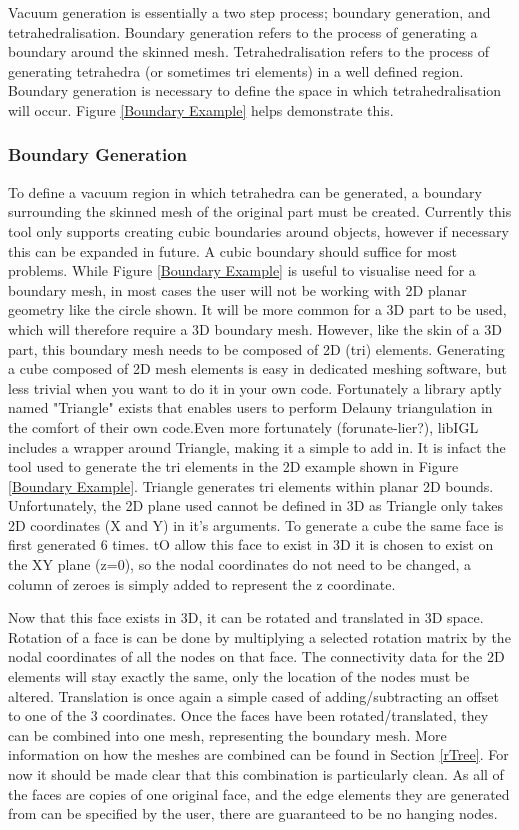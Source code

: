 \documentclass[12pt, letterpaper]{article}
\begin{document}
Vacuum generation is essentially a two step process; boundary generation, and tetrahedralisation. Boundary generation refers to the process of generating a boundary around the skinned mesh. Tetrahedralisation refers to the process of generating tetrahedra (or sometimes tri elements) in a well defined region. Boundary generation is necessary to define the space in which tetrahedralisation will occur. Figure \ref{Boundary Example} helps demonstrate this.

\subsubsection{Boundary Generation} \label{BoundaryGeneration}
To define a vacuum region in which tetrahedra can be generated, a boundary surrounding the skinned mesh of the original part must be created. Currently this tool only supports creating cubic boundaries around objects, however if necessary this can be expanded in future. A cubic boundary should suffice for most problems. While Figure \ref{Boundary Example} is useful to visualise need for a boundary mesh, in most cases the user will not be working with 2D planar geometry like the circle shown. It will be more common for a 3D part to be used, which will therefore require a 3D boundary mesh. However, like the skin of a 3D part, this boundary mesh needs to be composed of 2D (tri) elements. Generating a cube composed of 2D mesh elements is easy in dedicated meshing software, but less trivial when you want to do it in your own code. Fortunately a library aptly named "Triangle" exists that enables users to perform Delauny triangulation in the comfort of their own code.Even more fortunately (forunate-lier?), libIGL includes a wrapper around Triangle, making it a simple to add in. It is infact the tool used to generate the tri elements in the 2D example shown in Figure \ref{Boundary Example}. Triangle generates tri elements within planar 2D bounds. Unfortunately, the 2D plane used cannot be defined in 3D as Triangle only takes 2D coordinates (X and Y) in it's arguments. To generate a cube the same face is first generated 6 times. tO allow this face to exist in 3D it is chosen to exist on the XY plane (z=0), so the nodal coordinates do not need to be changed, a column of zeroes is simply added to represent the z coordinate. 

Now that this face exists in 3D, it can be rotated and translated in 3D space. Rotation of a face is can be done by multiplying a selected rotation matrix by the nodal coordinates of all the nodes on that face. The connectivity data for the 2D elements will stay exactly the same, only the location of the nodes must be altered. Translation is once again a simple cased of adding/subtracting an offset to one of the 3 coordinates. Once the faces have been rotated/translated, they can be combined into one mesh, representing the boundary mesh. More information on how the meshes are combined can be found in Section \ref{rTree}. For now it should be made clear that this combination is particularly clean. As all of the faces are copies of one original face, and the edge elements they are generated from can be specified by the user, there are guaranteed to be no hanging nodes.
\end{document}
